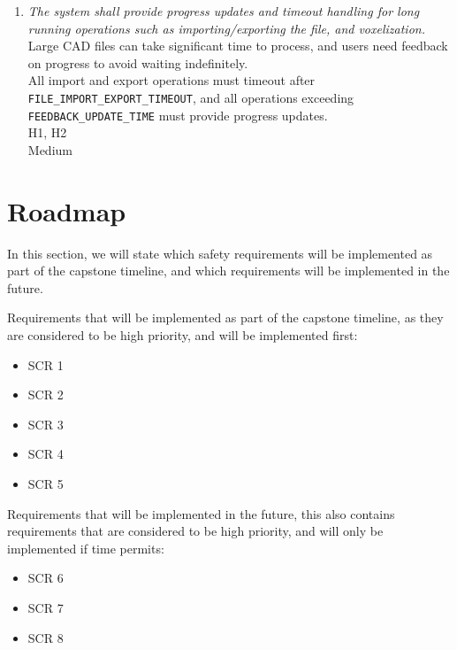 \documentclass{article}
\begin{document}
\begin{enumerate}
\item \emph{The system shall provide progress updates and timeout handling for long running operations such as importing/exporting the file, and voxelization.}\\
     Large CAD files can take significant time to process, and users need feedback on progress to avoid waiting indefinitely.\\
     All import and export operations must timeout after \texttt{FILE\_IMPORT\_EXPORT\_TIMEOUT}, and all operations exceeding \texttt{FEEDBACK\_UPDATE\_TIME} must provide progress updates.\\
     H1, H2\\
     Medium

\end{enumerate}

\iffalse
\wss{Newly discovered requirements.  These should also be added to the SRS.  (A
rationale design process how and why to fake it.)}
\fi

\section{Roadmap}

In this section, we will state which safety requirements will be implemented as part of the capstone timeline, and which requirements will be implemented in the future.

Requirements that will be implemented as part of the capstone timeline, as they are considered to be high priority, and will be implemented first:
\begin{itemize}
    \item SCR 1
    \item SCR 2
    \item SCR 3
    \item SCR 4
    \item SCR 5
\end{itemize}

Requirements that will be implemented in the future, this also contains requirements that are considered to be high priority, and will only be implemented if time permits:
\begin{itemize}
    \item SCR 6
    \item SCR 7
    \item SCR 8
\end{itemize}
\end{document}
